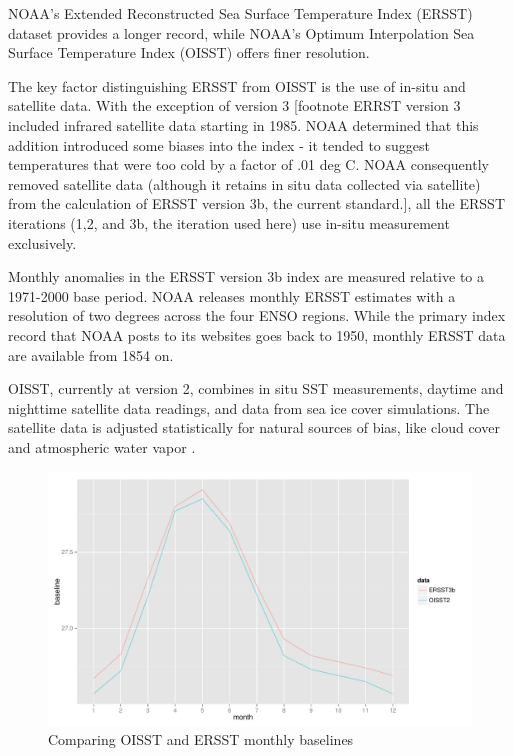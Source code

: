 \documentclass[authoryear]{article}
\begin{document}
NOAA's Extended Reconstructed Sea Surface Temperature Index (ERSST) dataset provides a longer record, while NOAA's Optimum Interpolation Sea Surface Temperature Index (OISST) offers finer resolution. 

The key factor distinguishing ERSST from OISST is the use of in-situ and satellite data. With the exception of version 3 [footnote ERRST version 3 included infrared satellite data starting in 1985. NOAA determined that this addition introduced some biases into the index - it tended to suggest temperatures that were too cold by a factor of .01 deg C. NOAA consequently removed satellite data (although it retains in situ data collected via satellite) from the calculation of ERSST version 3b, the current standard.], all the ERSST iterations (1,2, and 3b, the iteration used here) use in-situ measurement exclusively\cite{smith2004improved}\cite{smith2003extended}\cite{smith2008improvements}.

Monthly anomalies in the ERSST version 3b index are measured relative to a 1971-2000 base period\cite{xue2003interdecadal}. NOAA releases monthly ERSST estimates with a resolution of two degrees across the four ENSO regions. While the primary index record that NOAA posts to its websites goes back to 1950, monthly ERSST data are available from 1854 on.

OISST, currently at version 2, combines in situ SST measurements, daytime and nighttime satellite data readings, and data from sea ice cover simulations. The satellite data is adjusted statistically for natural sources of bias, like cloud cover and atmospheric water vapor\cite{reynolds2002improved} \cite{reynolds1994improved} \cite{reynolds1993improved} \cite{reynolds1988real}. 

\begin{figure}[!htbp]
  \includegraphics[width=\linewidth]{Pricingfigs/CompareOISSTandERRSTbaselines}
  \caption{Comparing OISST and ERSST monthly baselines}
   \label{fig:baeslinesOIER}
\end{figure}
\end{document}
